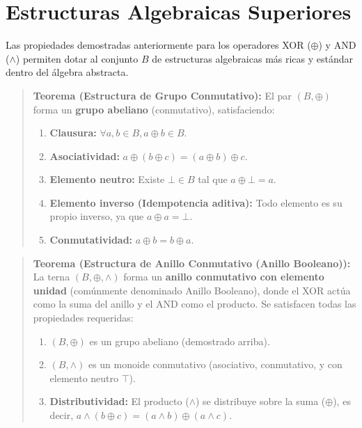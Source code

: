 \section{Estructuras Algebraicas Superiores}

Las propiedades demostradas anteriormente para los operadores XOR ($\oplus$) y AND ($\wedge$) permiten dotar al conjunto $B$ de estructuras algebraicas más ricas y estándar dentro del álgebra abstracta.

\begin{quote}\textbf{Teorema (Estructura de Grupo Conmutativo):}\label{grupo_xor}
El par $(B, \oplus)$ forma un \textbf{grupo abeliano} (conmutativo), satisfaciendo:
\begin{enumerate}
    \item \textbf{Clausura:} $\forall a,b \in B, a \oplus b \in B.$
    \item \textbf{Asociatividad:} $a \oplus (b \oplus c) = (a \oplus b) \oplus c.$
    \item \textbf{Elemento neutro:} Existe $\bot \in B$ tal que $a \oplus \bot = a.$
    \item \textbf{Elemento inverso (Idempotencia aditiva):} Todo elemento es su propio inverso, ya que $a \oplus a = \bot.$
    \item \textbf{Conmutatividad:} $a \oplus b = b \oplus a.$
\end{enumerate}
\end{quote}

\begin{quote}\textbf{Teorema (Estructura de Anillo Conmutativo (Anillo Booleano)):}\label{anillo_booleano}
La terna $(B, \oplus, \wedge)$ forma un \textbf{anillo conmutativo con elemento unidad} (comúnmente denominado Anillo Booleano), donde el XOR actúa como la suma del anillo y el AND como el producto. Se satisfacen todas las propiedades requeridas:
\begin{enumerate}
    \item $(B, \oplus)$ es un grupo abeliano (demostrado arriba).
    \item $(B, \wedge)$ es un monoide conmutativo (asociativo, conmutativo, y con elemento neutro $\top$).
    \item \textbf{Distributividad:} El producto ($\wedge$) se distribuye sobre la suma ($\oplus$), es decir, $a \wedge (b \oplus c) = (a \wedge b) \oplus (a \wedge c).$
\end{enumerate}
\end{quote}


